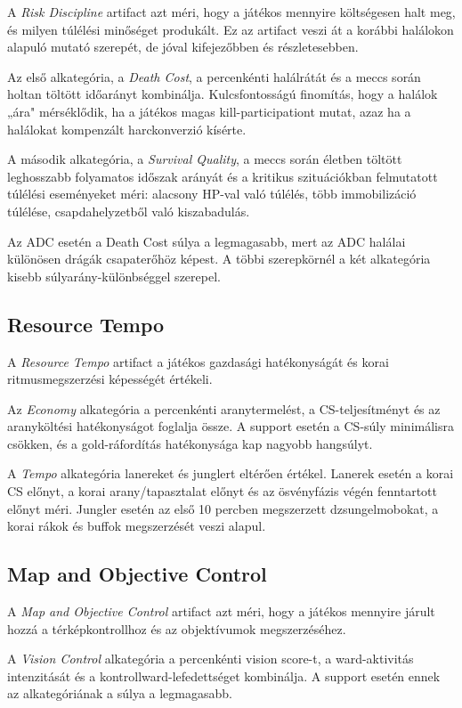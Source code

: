 A \textit{Risk Discipline} artifact azt méri, hogy a játékos mennyire költségesen halt meg, és milyen túlélési minőséget produkált. Ez az artifact veszi át a korábbi halálokon alapuló mutató szerepét, de jóval kifejezőbben és részletesebben.

Az első alkategória, a \emph{Death Cost}, a percenkénti halálrátát és a meccs során holtan töltött időarányt kombinálja. Kulcsfontosságú finomítás, hogy a halálok „ára" mérséklődik, ha a játékos magas kill-participationt mutat, azaz ha a halálokat kompenzált harckonverzió kísérte.

A második alkategória, a \emph{Survival Quality}, a meccs során életben töltött leghosszabb folyamatos időszak arányát és a kritikus szituációkban felmutatott túlélési eseményeket méri: alacsony HP-val való túlélés, több immobilizáció túlélése, csapdahelyzetből való kiszabadulás.

Az ADC esetén a Death Cost súlya a legmagasabb, mert az ADC halálai különösen drágák csapaterőhöz képest. A többi szerepkörnél a két alkategória kisebb súlyarány-különbséggel szerepel.

\subsection{Resource Tempo}

A \textit{Resource Tempo} artifact a játékos gazdasági hatékonyságát és korai ritmusmegszerzési képességét értékeli.

Az \emph{Economy} alkategória a percenkénti aranytermelést, a CS-teljesítményt és az aranyköltési hatékonyságot foglalja össze. A support esetén a CS-súly minimálisra csökken, és a gold-ráfordítás hatékonysága kap nagyobb hangsúlyt.

A \emph{Tempo} alkategória lanereket és junglert eltérően értékel. Lanerek esetén a korai CS előnyt, a korai arany/tapasztalat előnyt és az ösvényfázis végén fenntartott előnyt méri. Jungler esetén az első 10 percben megszerzett dzsungelmobokat, a korai rákok és buffok megszerzését veszi alapul.

\subsection{Map and Objective Control}

A \textit{Map and Objective Control} artifact azt méri, hogy a játékos mennyire járult hozzá a térképkontrollhoz és az objektívumok megszerzéséhez.

A \emph{Vision Control} alkategória a percenkénti vision score-t, a ward-aktivitás intenzitását és a kontrollward-lefedettséget kombinálja. A support esetén ennek az alkategóriának a súlya a legmagasabb.

